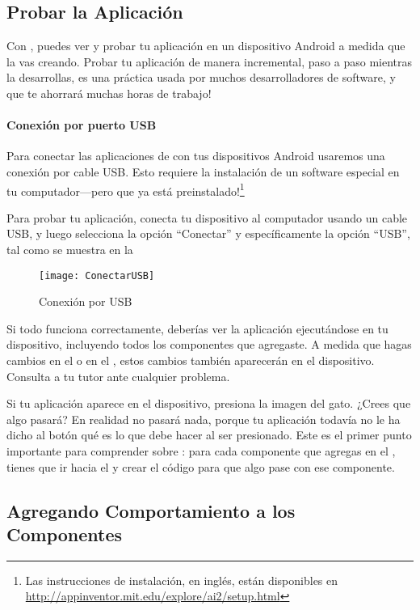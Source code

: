 \subsection*{Probar la Aplicación}

Con \AppInventor, puedes ver y probar tu aplicación en un dispositivo
Android a medida que la vas creando. Probar tu aplicación de manera
incremental, paso a paso mientras la desarrollas, es una práctica
usada por muchos desarrolladores de software, y que te ahorrará muchas
horas de trabajo!

\paragraph{Conexión por puerto USB}
Para conectar las aplicaciones de \AppInventor con tus dispositivos
Android usaremos una conexión por cable USB. Esto requiere la
instalación de un software especial en tu computador---pero que ya
está preinstalado!\footnote{Las instrucciones de instalación, en
  inglés, están disponibles en
  \url{http://appinventor.mit.edu/explore/ai2/setup.html}}

Para probar tu aplicación, conecta tu dispositivo al computador usando
un cable USB, y luego selecciona la opción ``Conectar'' y
específicamente la opción ``USB'', tal como se muestra en la~

\begin{figure}[H]
\centering
\texttt{[image: ConectarUSB]}
\caption{Conexión \AppInventor por USB}
\label{fig:conectarUSB}
\end{figure}

Si todo funciona correctamente, deberías ver la aplicación
 ejecutándose en tu dispositivo, incluyendo todos
los componentes que agregaste. A medida que hagas cambios en el
\componentDesigner o en el \blockEditor, estos cambios también
aparecerán en el dispositivo. Consulta a tu tutor ante cualquier
problema.

Si tu aplicación aparece en el dispositivo, presiona la imagen del
gato. ¿Crees que algo pasará? En realidad no pasará nada, porque tu
aplicación todavía no le ha dicho al botón qué es lo que debe hacer al
ser presionado. Este es el primer punto importante para comprender
sobre \AppInventor: para cada componente que agregas en el \designer,
tienes que ir hacia el \blockEditor y crear el código para que algo
pase con ese componente.

\subsection*{Agregando Comportamiento a los Componentes}

